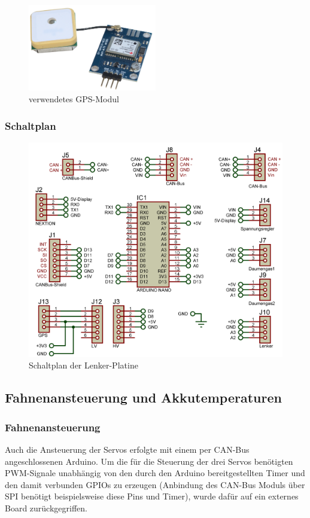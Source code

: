\begin{figure}[h]
    \centering
    \includegraphics[width=0.5\textwidth]{Fotos/GPS_Modul.png}
    \caption{verwendetes GPS-Modul}
\end{figure}

\newpage
\subsubsection{Schaltplan}
\begin{figure}[h]
    \centering
    \includegraphics[width=1.0\textwidth]{../Proteus/Exports/Lenker-Platine.png}    
    \caption{Schaltplan der Lenker-Platine}
\end{figure}

\newpage

\subsection{Fahnenansteuerung und Akkutemperaturen}
\subsubsection{Fahnenansteuerung}
Auch die Ansteuerung der Servos erfolgte mit einem per CAN-Bus angeschlossenen Arduino. Um die für die Steuerung der drei Servos benötigten PWM-Signale unabhängig von den durch den Arduino bereitgestellten Timer und den damit verbunden GPIOs zu erzeugen 
(Anbindung des CAN-Bus Moduls über SPI benötigt beispielsweise diese Pins und Timer), wurde dafür auf ein externes Board zurückgegriffen.

